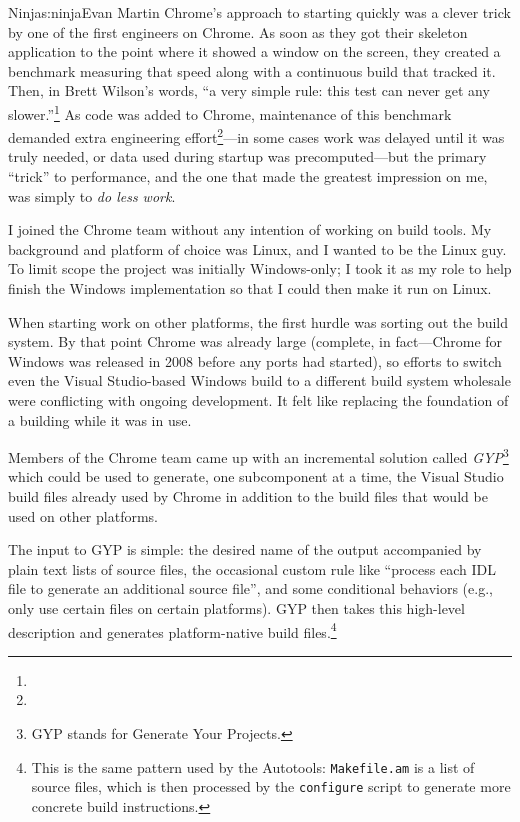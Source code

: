 \begin{aosachapter}{Ninja}{s:ninja}{Evan Martin}
Chrome's approach to starting quickly was a clever trick by one of the
first engineers on Chrome. As soon as they got their skeleton
application to the point where it showed a window on the screen, they
created a benchmark measuring that speed along with a continuous build
that tracked it. Then, in Brett Wilson's words, ``a very simple rule:
this test can never get any slower.''\footnote{}
As code was added to Chrome, maintenance of this benchmark demanded
extra engineering effort\footnote{}---in
some cases work was delayed until it was truly needed, or data used
during startup was precomputed---but the primary ``trick'' to
performance, and the one that made the greatest impression on me, was
simply to \emph{do less work}.

I joined the Chrome team without any intention of working on build
tools. My background and platform of choice was Linux, and I wanted to
be the Linux guy. To limit scope the project was initially Windows-only;
I took it as my role to help finish the Windows implementation so that I
could then make it run on Linux.

When starting work on other platforms, the first hurdle was sorting out
the build system. By that point Chrome was already large (complete, in
fact---Chrome for Windows was released in 2008 before any ports had
started), so efforts to switch even the Visual Studio-based Windows
build to a different build system wholesale were conflicting with
ongoing development. It felt like replacing the foundation of a building
while it was in use.

Members of the Chrome team came up with an incremental solution called
\emph{GYP}\footnote{GYP stands for Generate Your Projects.} which could
be used to generate, one subcomponent at a time, the Visual Studio build
files already used by Chrome in addition to the build files that would
be used on other platforms.

The input to GYP is simple: the desired name of the output accompanied
by plain text lists of source files, the occasional custom rule like
``process each IDL file to generate an additional source file'', and
some conditional behaviors (e.g., only use certain files on certain
platforms). GYP then takes this high-level description and generates
platform-native build files.\footnote{This is the same pattern used by
  the Autotools: \texttt{Makefile.am} is a list of source files, which
  is then processed by the \texttt{configure} script to generate more
  concrete build instructions.}


\end{aosachapter}
